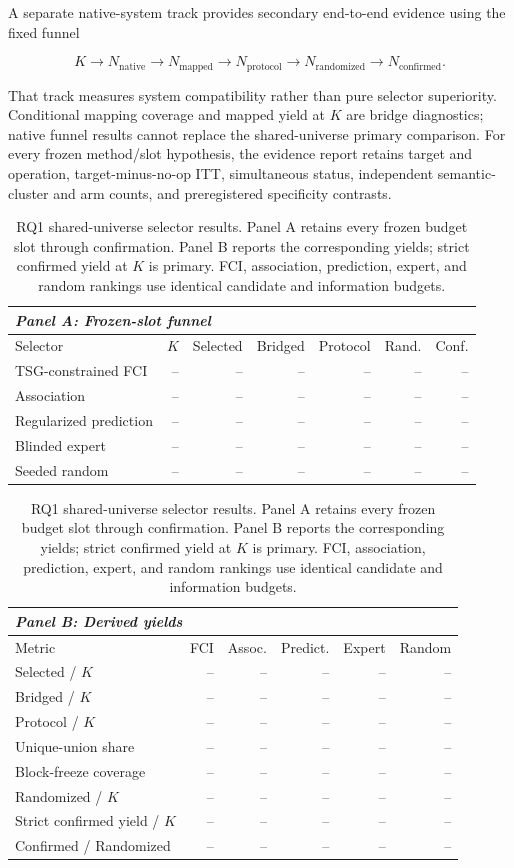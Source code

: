 \documentclass[acmsmall,screen,review,anonymous]{acmart}
\begin{document}
A separate native-system track provides secondary end-to-end evidence using
the fixed funnel

\[
K \rightarrow N_{\mathrm{native}} \rightarrow N_{\mathrm{mapped}}
\rightarrow N_{\mathrm{protocol}} \rightarrow N_{\mathrm{randomized}}
\rightarrow N_{\mathrm{confirmed}}.
\]

That track measures system compatibility rather than pure selector
superiority. Conditional mapping coverage and mapped yield at $K$ are bridge
diagnostics; native funnel results cannot replace the shared-universe primary
comparison. For every frozen method/slot hypothesis, the evidence report
retains target and operation, target-minus-no-op ITT, simultaneous status,
independent semantic-cluster and arm counts, and preregistered specificity
contrasts.

\begin{table}[H]
  \centering
  \small
  \caption{RQ1 shared-universe selector results. Panel A retains every frozen
  budget slot through confirmation. Panel B reports the corresponding yields;
  strict confirmed yield at $K$ is primary. FCI, association, prediction,
  expert, and random rankings use identical candidate and information
  budgets.}
  \label{tab:rq1}
  \begin{tabular}{lrrrrrr}
    \toprule
    \multicolumn{7}{l}{\textit{Panel A: Frozen-slot funnel}} \\
    \midrule
    Selector & $K$ & Selected & Bridged & Protocol & Rand. & Conf. \\
    \midrule
    TSG-constrained FCI & -- & -- & -- & -- & -- & -- \\
    Association & -- & -- & -- & -- & -- & -- \\
    Regularized prediction & -- & -- & -- & -- & -- & -- \\
    Blinded expert & -- & -- & -- & -- & -- & -- \\
    Seeded random & -- & -- & -- & -- & -- & -- \\
    \bottomrule
  \end{tabular}

  \medskip
  \begin{tabular}{lrrrrr}
    \toprule
    \multicolumn{6}{l}{\textit{Panel B: Derived yields}} \\
    \midrule
    Metric & FCI & Assoc. & Predict. & Expert & Random \\
    \midrule
    Selected / $K$ & -- & -- & -- & -- & -- \\
    Bridged / $K$ & -- & -- & -- & -- & -- \\
    Protocol / $K$ & -- & -- & -- & -- & -- \\
    Unique-union share & -- & -- & -- & -- & -- \\
    Block-freeze coverage & -- & -- & -- & -- & -- \\
    Randomized / $K$ & -- & -- & -- & -- & -- \\
    Strict confirmed yield / $K$ & -- & -- & -- & -- & -- \\
    Confirmed / Randomized & -- & -- & -- & -- & -- \\
    \bottomrule
  \end{tabular}
\end{table}
\end{document}
